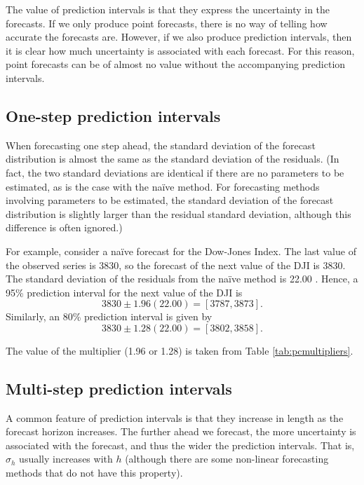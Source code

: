 \documentclass[]{book}
\begin{document}
The value of prediction intervals is that they express the uncertainty in the forecasts. If we only produce point forecasts, there is no way of telling how accurate the forecasts are. However, if we also produce prediction intervals, then it is clear how much uncertainty is associated with each forecast. For this reason, point forecasts can be of almost no value without the accompanying prediction intervals.

\hypertarget{one-step-prediction-intervals}{%
\subsection*{One-step prediction intervals}\label{one-step-prediction-intervals}}

When forecasting one step ahead, the standard deviation of the forecast distribution is almost the same as the standard deviation of the residuals. (In fact, the two standard deviations are identical if there are no parameters to be estimated, as is the case with the naïve method. For forecasting methods involving parameters to be estimated, the standard deviation of the forecast distribution is slightly larger than the residual standard deviation, although this difference is often ignored.)

For example, consider a naïve forecast for the Dow-Jones Index. The last value of the observed series is 3830, so the forecast of the next value of the DJI is 3830. The standard deviation of the residuals from the naïve method is 22.00 . Hence, a 95\% prediction interval for the next value of the DJI is
\[
  3830 \pm 1.96(22.00) = [3787, 3873].
\]
Similarly, an 80\% prediction interval is given by
\[
  3830 \pm 1.28(22.00) = [3802, 3858].
\]

The value of the multiplier (1.96 or 1.28) is taken from Table \ref{tab:pcmultipliers}.

\hypertarget{multi-step-prediction-intervals}{%
\subsection*{Multi-step prediction intervals}\label{multi-step-prediction-intervals}}

A common feature of prediction intervals is that they increase in length as the forecast horizon increases. The further ahead we forecast, the more uncertainty is associated with the forecast, and thus the wider the prediction intervals. That is, \(\sigma_h\) usually increases with \(h\) (although there are some non-linear forecasting methods that do not have this property).
\end{document}
